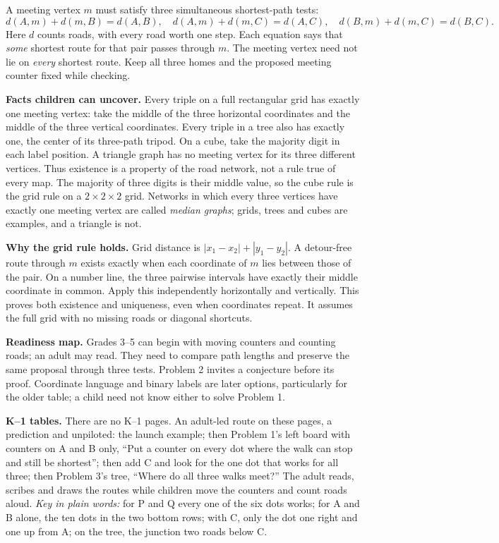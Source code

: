 \documentclass[11pt,letterpaper]{article}
\newcommand{\heading}[1]{\par\vspace{5pt}{\large\bfseries #1}\par\nobreak}
\begin{document}
\heading{Mathematical destination}
A meeting vertex $m$ must satisfy three simultaneous shortest-path tests:
\[
d(A,m)+d(m,B)=d(A,B),\quad
 d(A,m)+d(m,C)=d(A,C),\quad
 d(B,m)+d(m,C)=d(B,C).
\]
Here $d$ counts roads, with every road worth one step. Each equation says that \emph{some} shortest route for that pair passes through $m$. The meeting vertex need not lie on \emph{every} shortest route. Keep all three homes and the proposed meeting counter fixed while checking.

\textbf{Facts children can uncover.} Every triple on a full rectangular grid has exactly one meeting vertex: take the middle of the three horizontal coordinates and the middle of the three vertical coordinates. Every triple in a tree also has exactly one, the center of its three-path tripod. On a cube, take the majority digit in each label position. A triangle graph has no meeting vertex for its three different vertices. Thus existence is a property of the road network, not a rule true of every map. The majority of three digits is their middle value, so the cube rule is the grid rule on a $2\times2\times2$ grid. Networks in which every three vertices have exactly one meeting vertex are called \emph{median graphs}; grids, trees and cubes are examples, and a triangle is not.

\textbf{Why the grid rule holds.} Grid distance is $|x_1-x_2|+|y_1-y_2|$. A detour-free route through $m$ exists exactly when each coordinate of $m$ lies between those of the pair. On a number line, the three pairwise intervals have exactly their middle coordinate in common. Apply this independently horizontally and vertically. This proves both existence and uniqueness, even when coordinates repeat. It assumes the full grid with no missing roads or diagonal shortcuts.

\textbf{Readiness map.} Grades 3--5 can begin with moving counters and counting roads; an adult may read. They need to compare path lengths and preserve the same proposal through three tests. Problem 2 invites a conjecture before its proof. Coordinate language and binary labels are later options, particularly for the older table; a child need not know either to solve Problem 1.

\textbf{K--1 tables.} There are no K--1 pages. An adult-led route on these pages, a prediction and unpiloted: the launch example; then Problem 1's left board with counters on A and B only, ``Put a counter on every dot where the walk can stop and still be shortest''; then add C and look for the one dot that works for all three; then Problem 3's tree, ``Where do all three walks meet?'' The adult reads, scribes and draws the routes while children move the counters and count roads aloud. \emph{Key in plain words:} for P and Q every one of the six dots works; for A and B alone, the ten dots in the two bottom rows; with C, only the dot one right and one up from A; on the tree, the junction two roads below C.
\end{document}
